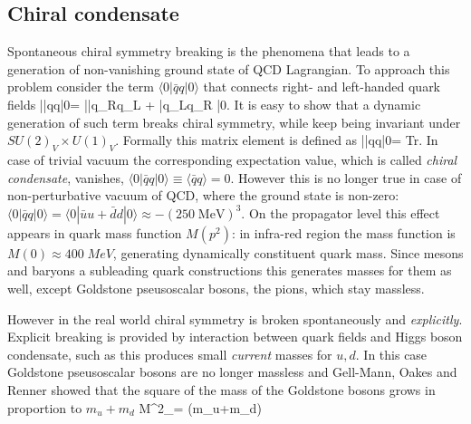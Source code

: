 	\subsection*{Chiral condensate}
Spontaneous chiral symmetry breaking is the phenomena that leads to a generation of non-vanishing ground state of QCD Lagrangian. To approach this problem consider the term $\langle0|\bar{q}q|0\rangle$ that connects right- and left-handed quark fields
\beqa
	|\bar{q}q|0\rangle = |\bar{q_R}q_L + \bar{q_L}q_R |0\rangle\;.
\eeqa
It is easy to show that a dynamic generation of such term breaks chiral symmetry, while keep being invariant under $SU(2)_V \times U(1)_V$. Formally this matrix element is defined as
\beqa
	|\bar{q}q|0\rangle = \int {} Tr\left[  S(k) \right] \;.
\eeqa
In case of trivial vacuum the corresponding expectation value, which is called \textit{chiral condensate}, vanishes, $\langle0|\bar{q}q|0\rangle \equiv \langle\bar{q}q\rangle = 0$. However this is no longer true in case of non-perturbative vacuum of QCD, where the ground state is non-zero: $\langle0|\bar{q}q|0\rangle = \langle0|\bar{u}u + \bar{d}d|0\rangle \approx -(250 \; \text{MeV})^3$. On the propagator level this effect appears in quark mass function $M(p^2)$: in infra-red region the mass function is $M(0)\approx 400 \; MeV$, generating dynamically constituent quark mass. Since mesons and baryons a subleading quark constructions this generates masses for them as well, except Goldstone pseusoscalar bosons, the pions, which stay massless.

However in the real world chiral symmetry is broken spontaneously and \textit{explicitly}. Explicit breaking is provided by interaction between quark fields and Higgs boson condensate, such as this produces small \textit{current} masses for $u,d$. In this case Goldstone pseusoscalar bosons are no longer massless and Gell-Mann, Oakes and Renner \cite{GellMann:1968rz} showed that the square of the mass of the Goldstone bosons grows in proportion to $m_u + m_d$
\beqa
	\label{qcd_low:GMOR}
	M^2_\pi = (m_u+m_d)
\eeqa

	
